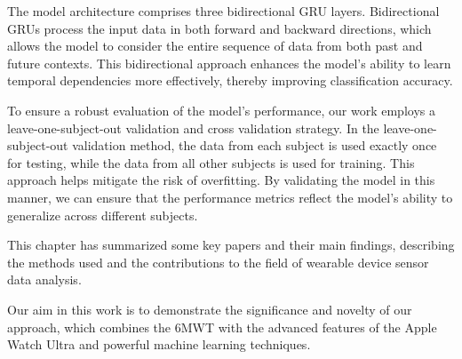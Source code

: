 The model architecture comprises three bidirectional GRU layers. Bidirectional GRUs process the input data in both forward and backward directions, which allows the model to consider the entire sequence of data from both past and future contexts. This bidirectional approach enhances the model's ability to learn temporal dependencies more effectively, thereby improving classification accuracy.

To ensure a robust evaluation of the model's performance, our work employs a leave-one-subject-out validation and cross validation strategy. In the leave-one-subject-out validation method, the data from each subject is used exactly once for testing, while the data from all other subjects is used for training. This approach helps mitigate the risk of overfitting. By validating the model in this manner, we can ensure that the performance metrics reflect the model's ability to generalize across different subjects.

\newpage
This chapter has summarized some key papers and their main findings, describing the methods used and the contributions to the field of wearable device sensor data analysis. 

Our aim in this work is to demonstrate the significance and novelty of our approach, which combines the 6MWT with the advanced features of the Apple Watch Ultra and powerful machine learning techniques.